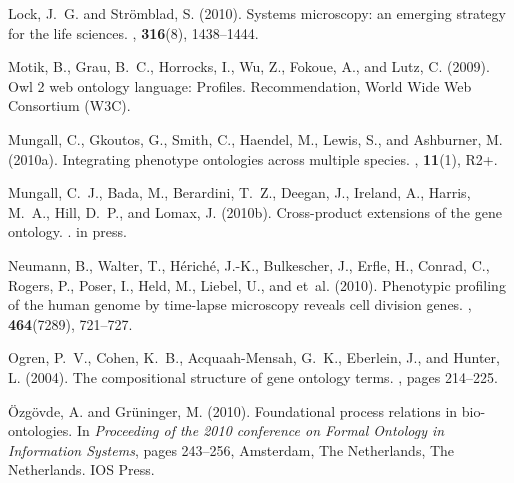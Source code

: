 \documentclass{bioinfo}
\begin{document}
\begin{thebibliography}{}
Lock, J.~G. and Strömblad, S. (2010).
\newblock Systems microscopy: an emerging strategy for the life sciences.
, {\bf 316}(8), 1438--1444.

Motik, B., Grau, B.~C., Horrocks, I., Wu, Z., Fokoue, A., and Lutz, C. (2009).
\newblock Owl 2 web ontology language: Profiles.
\newblock Recommendation, World Wide Web Consortium (W3C).

Mungall, C., Gkoutos, G., Smith, C., Haendel, M., Lewis, S., and Ashburner, M.
  (2010a).
\newblock Integrating phenotype ontologies across multiple species.
, {\bf 11}(1), R2+.

Mungall, C.~J., Bada, M., Berardini, T.~Z., Deegan, J., Ireland, A., Harris,
  M.~A., Hill, D.~P., and Lomax, J. (2010b).
\newblock Cross-product extensions of the gene ontology.
.
\newblock in press.

Neumann, B., Walter, T., Hériché, J.-K., Bulkescher, J., Erfle, H., Conrad,
  C., Rogers, P., Poser, I., Held, M., Liebel, U., and et~al. (2010).
\newblock Phenotypic profiling of the human genome by time-lapse microscopy
  reveals cell division genes.
, {\bf 464}(7289), 721--727.

Ogren, P.~V., Cohen, K.~B., Acquaah-Mensah, G.~K., Eberlein, J., and Hunter, L.
  (2004).
\newblock The compositional structure of gene ontology terms.
, pages 214--225.

\"{O}zg\"{o}vde, A. and Gr\"{u}ninger, M. (2010).
\newblock Foundational process relations in bio-ontologies.
\newblock In {\em Proceeding of the 2010 conference on Formal Ontology in
  Information Systems\/}, pages 243--256, Amsterdam, The Netherlands, The
  Netherlands. IOS Press.


\end{thebibliography}
\end{document}
